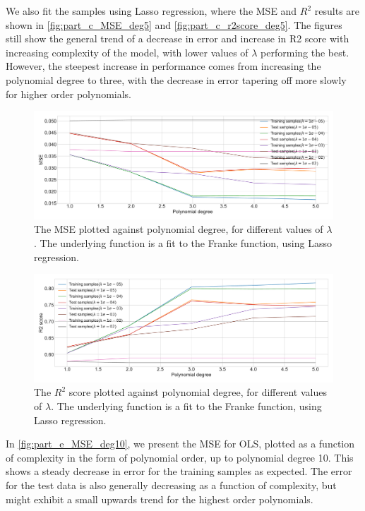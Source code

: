 \documentclass[12pt]{article}
\begin{document}
We also fit the samples using Lasso regression, where the MSE and $R^2$ results are shown in \autoref{fig:part_c_MSE_deg5} and \autoref{fig:part_c_r2score_deg5}. The figures still show the general trend of a decrease in error and increase in R2 score with increasing complexity of the model, with lower values of $\lambda$ performing the best. However, the steepest increase in performance comes from increasing the polynomial degree to three, with the decrease in error tapering off more slowly for higher order polynomials.  

\begin{figure}
    \centering
    \includegraphics[width=1\linewidth]{images/part_c_MSE_deg5.pdf}
    \caption{The MSE plotted against polynomial degree, for different values of $\lambda$. The underlying function is a fit to the Franke function, using Lasso regression.}
    \label{fig:part_c_MSE_deg5}
\end{figure}

\begin{figure}
    \centering
    \includegraphics[width=1\linewidth]{images/part_c_r2score_deg5.pdf}
    \caption{The $R^2$ score plotted against polynomial degree, for different values of $\lambda$. The underlying function is a fit to the Franke function, using Lasso regression.}
    \label{fig:part_c_r2score_deg5}
\end{figure}

In \autoref{fig:part_e_MSE_deg10}, we present the MSE for OLS, plotted as a function of complexity in the form of polynomial order, up to polynomial degree 10. This shows a steady decrease in error for the training samples as expected. The error for the test data is also generally decreasing as a function of complexity, but might exhibit a small upwards trend for the highest order polynomials. 
\end{document}
